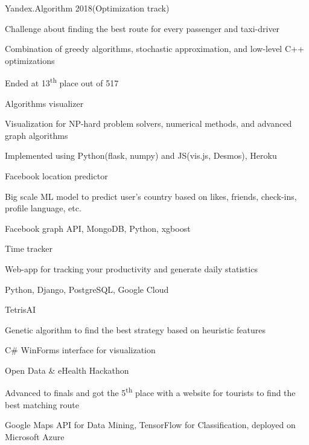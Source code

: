 \begin{cventries}
  \cventry
    {Yandex.Algorithm 2018(Optimization track)}
    {}{}{}
    {
      \begin{cvitems}
        \item {Challenge about finding the best route for every passenger and taxi-driver}
        \item {Combination of greedy algorithms, stochastic approximation, and low-level C++ optimizations}
        \item {Ended at 13\textsuperscript{th} place out of 517 }
      \end{cvitems}
    }
  \cventry
    {Algorithms visualizer}
    {}{}{}
    {
      \begin{cvitems}
        \item {Visualization for NP-hard problem solvers, numerical methods, and advanced graph algorithms}
        \item {Implemented using Python(flask, numpy) and JS(vis.js, Desmos), Heroku}
      \end{cvitems}
    }
  \cventry
    {Facebook location predictor}
    {}{}{}
    {
      \begin{cvitems}
        \item {Big scale ML model to predict user's country based on likes, friends, check-ins, profile language, etc.}
        \item {Facebook graph API, MongoDB, Python, xgboost}
      \end{cvitems}
    }
  \cventry
    {Time tracker}
    {}{}{}
    {
      \begin{cvitems}
        \item {Web-app for tracking your productivity and generate daily statistics}
        \item {Python, Django, PostgreSQL, Google Cloud}
      \end{cvitems}
    }  
  \cventry
    {TetrisAI}
    {}{}{}
    {
      \begin{cvitems}
        \item {Genetic algorithm to find the best strategy based on heuristic features}
        \item {C\# WinForms interface for visualization}
      \end{cvitems}
    }
  \cventry
    {Open Data \& eHealth Hackathon}
    {}{}{}
    {
      \begin{cvitems}
        \item {Advanced to finals and got the 5\textsuperscript{th} place with a website for tourists to find the best matching route}
        \item {Google Maps API for Data Mining, TensorFlow for Classification, deployed on Microsoft Azure}
      \end{cvitems}
    }  

\end{cventries}
